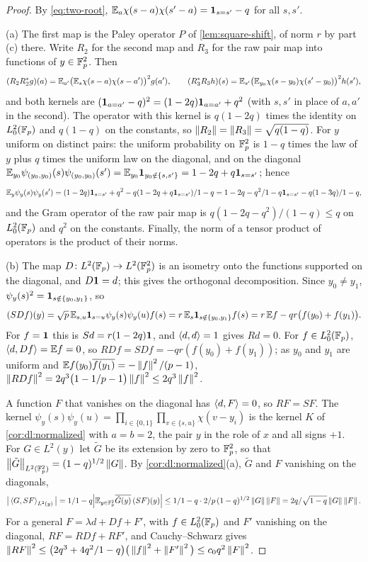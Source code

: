 \begin{proof}
By \eqref{eq:two-root}, $\mathbb E_a\chi(s-a)\chi(s'-a)=\mathbf 1_{s=s'}-q$ for all $s,s'$.

(a) The first map is the Paley operator $P$ of \cref{lem:square-shift}, of norm
$r$ by part (c) there. Write $R_2$ for the second map and $R_3$ for the raw pair
map into functions of $y\in\mathbb F_p^2$. Then
\[
 (R_2R_2^*g)(a)=\mathbb E_{a'}\big(\mathbb E_s\chi(s-a)\chi(s-a')\big)^2g(a'),\qquad
 (R_3^*R_3h)(s)=\mathbb E_{s'}\big(\mathbb E_{y_0}\chi(s-y_0)\chi(s'-y_0)\big)^2h(s'),
\]
and both kernels are $(\mathbf 1_{a=a'}-q)^2=(1-2q)\mathbf 1_{a=a'}+q^2$ (with $s,s'$ in
place of $a,a'$ in the second). The operator with this kernel is $q(1-2q)$ times
the identity on $L^2_0(\mathbb F_p)$ and $q(1-q)$ on the constants, so
$\left\|R_2\right\|=\left\|R_3\right\|=\sqrt{q(1-q)}$. For $y$ uniform on distinct pairs: the
uniform probability on $\mathbb F_p^2$ is $1-q$ times the law of $y$ plus $q$ times the
uniform law on the diagonal, and on the diagonal
$\mathbb E_{y_0}\psi_{(y_0,y_0)}(s)\psi_{(y_0,y_0)}(s')=\mathbb E_{y_0}\mathbf 1_{y_0\notin\{s,s'\}}
=1-2q+q\mathbf 1_{s=s'}$; hence
\[
 \mathbb E_y\psi_y(s)\psi_y(s')=(1-2q)\mathbf 1_{s=s'}+q^2-q(1-2q+q\mathbf 1_{s=s'})/1-q
 =1-2q-q^2/1-q\mathbf 1_{s=s'}-q(1-3q)/1-q,
\]
and the Gram operator of the raw pair map is $q(1-2q-q^2)/(1-q)\le q$ on
$L^2_0(\mathbb F_p)$ and $q^2$ on the constants. Finally, the norm of a tensor product of
operators is the product of their norms.

(b) The map $D\colon L^2(\mathbb F_p)\to L^2(\mathbb F_p^2)$ is an isometry onto the functions
supported on the diagonal, and $D\mathbf 1=d$; this gives the orthogonal
decomposition. Since $y_0\ne y_1$, $\psi_y(s)^2=\mathbf 1_{s\notin\{y_0,y_1\}}$, so
\[
 (SDf)(y)=\sqrt p\,\mathbb E_{s,u}\mathbf 1_{s=u}\psi_y(s)\psi_y(u)f(s)
 =r\,\mathbb E_s\mathbf 1_{s\notin\{y_0,y_1\}}f(s)=r\,\mathbb E f-qr\big(f(y_0)+f(y_1)\big).
\]
For $f=\mathbf 1$ this is $Sd=r(1-2q)\mathbf 1$, and $\left\langle d,d\right\rangle=1$ gives $Rd=0$. For
$f\in L^2_0(\mathbb F_p)$, $\left\langle d,Df\right\rangle=\mathbb E f=0$, so $RDf=SDf=-qr(f(y_0)+f(y_1))$; as $y_0$
and $y_1$ are uniform and $\mathbb E f(y_0)\overline{f(y_1)}=-\left\|f\right\|^2/(p-1)$,
$\left\|RDf\right\|^2=2q^3\big(1-1/p-1\big)\left\|f\right\|^2\le2q^3\left\|f\right\|^2$.

A function $F$ that vanishes on the diagonal has $\left\langle d,F\right\rangle=0$, so $RF=SF$. The
kernel $\psi_y(s)\psi_y(u)=\prod_{i\in\{0,1\}}\prod_{v\in\{s,u\}}\chi(v-y_i)$ is the
kernel $K$ of \cref{cor:dl:normalized} with $a=b=2$, the pair $y$ in the role of
$x$ and all signs $+1$. For $G\in L^2(y)$ let $\tilde G$ be its extension by zero
to $\mathbb F_p^2$, so that $\left\|\tilde G\right\|_{L^2(\mathbb F_p^2)}=(1-q)^{1/2}\left\|G\right\|$. By
\cref{cor:dl:normalized}(a), $\tilde G$ and $F$ vanishing on the diagonals,
\[
 \big|\left\langle G,SF\right\rangle_{L^2(y)}\big|
 =1/1-q\Big|\mathbb E_{y\in\mathbb F_p^2}\overline{\tilde G(y)}\,(SF)(y)\Big|
 \le1/1-q\cdot2/p\,(1-q)^{1/2}\left\|G\right\|\left\|F\right\|
 =2q/\sqrt{1-q}\left\|G\right\|\left\|F\right\| .
\]
For a general $F=\lambda d+Df+F'$, with $f\in L^2_0(\mathbb F_p)$ and $F'$ vanishing on
the diagonal, $RF=RDf+RF'$, and Cauchy--Schwarz gives
$\left\|RF\right\|^2\le\big(2q^3+4q^2/1-q\big)\big(\left\|f\right\|^2+\left\|F'\right\|^2\big)
\le c_0q^2\left\|F\right\|^2$.


\end{proof}
